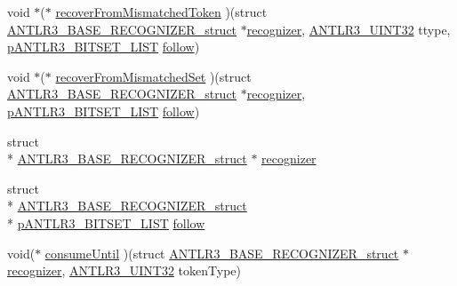 \begin{DoxyCompactItemize}
void $\ast$($\ast$ \hyperlink{struct_a_n_t_l_r3___b_a_s_e___r_e_c_o_g_n_i_z_e_r__struct_ae7d73ad15b172396aefd64d0b7316f1e}{recover\-From\-Mismatched\-Token} )(struct \hyperlink{struct_a_n_t_l_r3___b_a_s_e___r_e_c_o_g_n_i_z_e_r__struct}{A\-N\-T\-L\-R3\-\_\-\-B\-A\-S\-E\-\_\-\-R\-E\-C\-O\-G\-N\-I\-Z\-E\-R\-\_\-struct} $\ast$\hyperlink{struct_a_n_t_l_r3___b_a_s_e___r_e_c_o_g_n_i_z_e_r__struct_aa7ab273aa44860cea6cd6e41528b57af}{recognizer}, \hyperlink{antlr3defs_8h_ac41f744abd0fd25144b9eb9d11b1dfd1}{A\-N\-T\-L\-R3\-\_\-\-U\-I\-N\-T32} ttype, \hyperlink{antlr3interfaces_8h_a59ad40804c151729987ddc3e78c2d95f}{p\-A\-N\-T\-L\-R3\-\_\-\-B\-I\-T\-S\-E\-T\-\_\-\-L\-I\-S\-T} \hyperlink{struct_a_n_t_l_r3___b_a_s_e___r_e_c_o_g_n_i_z_e_r__struct_a7bff9fe6af6e7c6ddccd99de75fb034b}{follow})
\item 
void $\ast$($\ast$ \hyperlink{struct_a_n_t_l_r3___b_a_s_e___r_e_c_o_g_n_i_z_e_r__struct_a0edf91687d5ef5507f94d9861ee514cc}{recover\-From\-Mismatched\-Set} )(struct \hyperlink{struct_a_n_t_l_r3___b_a_s_e___r_e_c_o_g_n_i_z_e_r__struct}{A\-N\-T\-L\-R3\-\_\-\-B\-A\-S\-E\-\_\-\-R\-E\-C\-O\-G\-N\-I\-Z\-E\-R\-\_\-struct} $\ast$\hyperlink{struct_a_n_t_l_r3___b_a_s_e___r_e_c_o_g_n_i_z_e_r__struct_aa7ab273aa44860cea6cd6e41528b57af}{recognizer}, \hyperlink{antlr3interfaces_8h_a59ad40804c151729987ddc3e78c2d95f}{p\-A\-N\-T\-L\-R3\-\_\-\-B\-I\-T\-S\-E\-T\-\_\-\-L\-I\-S\-T} \hyperlink{struct_a_n_t_l_r3___b_a_s_e___r_e_c_o_g_n_i_z_e_r__struct_a7bff9fe6af6e7c6ddccd99de75fb034b}{follow})
\item 
struct \\*
\hyperlink{struct_a_n_t_l_r3___b_a_s_e___r_e_c_o_g_n_i_z_e_r__struct}{A\-N\-T\-L\-R3\-\_\-\-B\-A\-S\-E\-\_\-\-R\-E\-C\-O\-G\-N\-I\-Z\-E\-R\-\_\-struct} $\ast$ \hyperlink{struct_a_n_t_l_r3___b_a_s_e___r_e_c_o_g_n_i_z_e_r__struct_aa7ab273aa44860cea6cd6e41528b57af}{recognizer}
\item 
struct \\*
\hyperlink{struct_a_n_t_l_r3___b_a_s_e___r_e_c_o_g_n_i_z_e_r__struct}{A\-N\-T\-L\-R3\-\_\-\-B\-A\-S\-E\-\_\-\-R\-E\-C\-O\-G\-N\-I\-Z\-E\-R\-\_\-struct} \\*
\hyperlink{antlr3interfaces_8h_a59ad40804c151729987ddc3e78c2d95f}{p\-A\-N\-T\-L\-R3\-\_\-\-B\-I\-T\-S\-E\-T\-\_\-\-L\-I\-S\-T} \hyperlink{struct_a_n_t_l_r3___b_a_s_e___r_e_c_o_g_n_i_z_e_r__struct_a7bff9fe6af6e7c6ddccd99de75fb034b}{follow}
\item 
void($\ast$ \hyperlink{struct_a_n_t_l_r3___b_a_s_e___r_e_c_o_g_n_i_z_e_r__struct_ac0f5cbb6c09663060d050c048b099bb2}{consume\-Until} )(struct \hyperlink{struct_a_n_t_l_r3___b_a_s_e___r_e_c_o_g_n_i_z_e_r__struct}{A\-N\-T\-L\-R3\-\_\-\-B\-A\-S\-E\-\_\-\-R\-E\-C\-O\-G\-N\-I\-Z\-E\-R\-\_\-struct} $\ast$\hyperlink{struct_a_n_t_l_r3___b_a_s_e___r_e_c_o_g_n_i_z_e_r__struct_aa7ab273aa44860cea6cd6e41528b57af}{recognizer}, \hyperlink{antlr3defs_8h_ac41f744abd0fd25144b9eb9d11b1dfd1}{A\-N\-T\-L\-R3\-\_\-\-U\-I\-N\-T32} token\-Type)

\end{DoxyCompactItemize}
